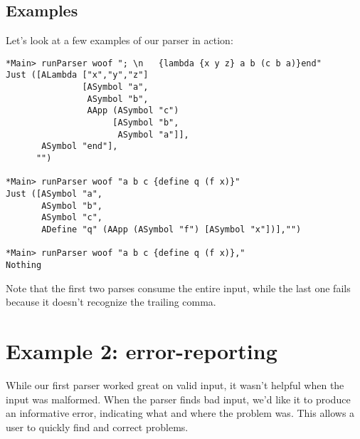 \documentclass{tmr}
\begin{document}
\subsection{Examples}
Let's look at a few examples of our parser in action:
\begin{verbatim}
*Main> runParser woof "; \n   {lambda {x y z} a b (c b a)}end"
Just ([ALambda ["x","y","z"] 
               [ASymbol "a",
                ASymbol "b",
                AApp (ASymbol "c") 
                     [ASymbol "b",
                      ASymbol "a"]],
       ASymbol "end"],
      "")

*Main> runParser woof "a b c {define q (f x)}"
Just ([ASymbol "a",
       ASymbol "b",
       ASymbol "c",
       ADefine "q" (AApp (ASymbol "f") [ASymbol "x"])],"")

*Main> runParser woof "a b c {define q (f x)},"
Nothing
\end{verbatim}
Note that the first two parses consume the entire input, while the last one 
fails because it doesn't recognize the trailing comma.




\section{Example 2: error-reporting}
While our first parser worked great on valid input, it wasn't helpful
when the input was malformed.  When the parser finds bad input, we'd like it to 
produce an informative error, indicating what and where the problem was.  
This allows a user to quickly find and correct problems.
\end{document}
